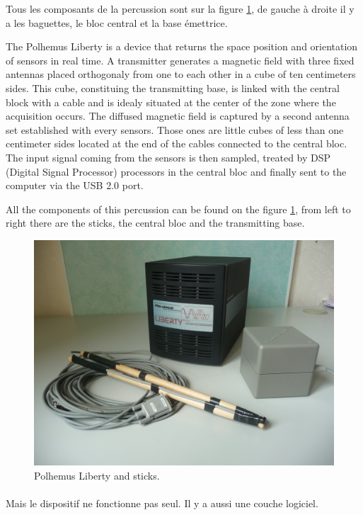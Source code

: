 Tous les composants de la percussion sont sur la figure \ref{fig:percu}, de gauche à droite il y a les baguettes, le bloc central et la base émettrice.

The Polhemus Liberty is a device that returns the space position and orientation of sensors in real time. A transmitter generates a magnetic field with three fixed antennas placed orthogonaly from one to each other in a cube of ten centimeters sides. This cube, constituing the transmitting base, is linked with the central block with a cable and is idealy situated at the center of the zone where the acquisition occurs. The diffused magnetic field is captured by a second antenna set established with every sensors. Those ones are little cubes of less than one centimeter sides located at the end of the cables connected to the central bloc. The input signal coming from the sensors is then sampled, treated by DSP (Digital Signal Processor) processors in the central bloc and finally sent to the computer via the USB 2.0 port.

All the components of this percussion can be found on the figure \ref{fig:percu}, from left to right there are the sticks, the central bloc and the transmitting base.

\begin{figure}[h!]
\centering\includegraphics[scale=0.11]{image/percu.jpg}
\caption{Polhemus Liberty and sticks.}
\label{fig:percu}
\end{figure}

\paragraph{}
Mais le dispositif ne fonctionne pas seul. Il y a aussi une couche logiciel.

